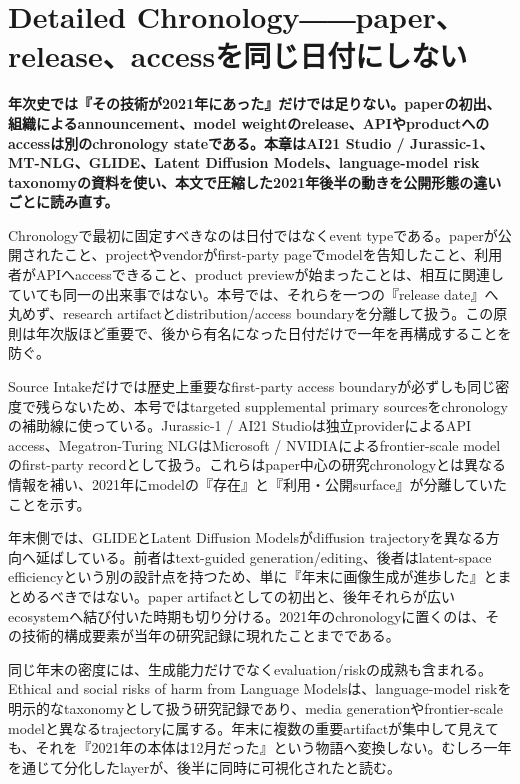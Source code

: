 \section{Detailed Chronology――paper、release、accessを同じ日付にしない}
\noindent\textbf{年次史では『その技術が2021年にあった』だけでは足りない。paperの初出、組織によるannouncement、model weightのrelease、APIやproductへのaccessは別のchronology stateである。本章はAI21 Studio / Jurassic-1、MT-NLG、GLIDE、Latent Diffusion Models、language-model risk taxonomyの資料を使い、本文で圧縮した2021年後半の動きを公開形態の違いごとに読み直す。}\autocite{src-20fd9bba2e7a,src-50244427230b,src-a4561c635fe6,src-b307b4b82867,src-bf581c89a17f}

Chronologyで最初に固定すべきなのは日付ではなくevent typeである。paperが公開されたこと、projectやvendorがfirst-party pageでmodelを告知したこと、利用者がAPIへaccessできること、product previewが始まったことは、相互に関連していても同一の出来事ではない。本号では、それらを一つの『release date』へ丸めず、research artifactとdistribution/access boundaryを分離して扱う。この原則は年次版ほど重要で、後から有名になった日付だけで一年を再構成することを防ぐ。\autocite{src-50244427230b,src-b307b4b82867,src-bf581c89a17f}


Source Intakeだけでは歴史上重要なfirst-party access boundaryが必ずしも同じ密度で残らないため、本号ではtargeted supplemental primary sourcesをchronologyの補助線に使っている。Jurassic-1 / AI21 Studioは独立providerによるAPI access、Megatron-Turing NLGはMicrosoft / NVIDIAによるfrontier-scale modelのfirst-party recordとして扱う。これらはpaper中心の研究chronologyとは異なる情報を補い、2021年にmodelの『存在』と『利用・公開surface』が分離していたことを示す。\autocite{src-b307b4b82867,src-bf581c89a17f}


年末側では、GLIDEとLatent Diffusion Modelsがdiffusion trajectoryを異なる方向へ延ばしている。前者はtext-guided generation/editing、後者はlatent-space efficiencyという別の設計点を持つため、単に『年末に画像生成が進歩した』とまとめるべきではない。paper artifactとしての初出と、後年それらが広いecosystemへ結び付いた時期も切り分ける。2021年のchronologyに置くのは、その技術的構成要素が当年の研究記録に現れたことまでである。\autocite{src-50244427230b,src-a4561c635fe6}


同じ年末の密度には、生成能力だけでなくevaluation/riskの成熟も含まれる。Ethical and social risks of harm from Language Modelsは、language-model riskを明示的なtaxonomyとして扱う研究記録であり、media generationやfrontier-scale modelと異なるtrajectoryに属する。年末に複数の重要artifactが集中して見えても、それを『2021年の本体は12月だった』という物語へ変換しない。むしろ一年を通じて分化したlayerが、後半に同時に可視化されたと読む。\autocite{src-20fd9bba2e7a,src-50244427230b,src-a4561c635fe6}



